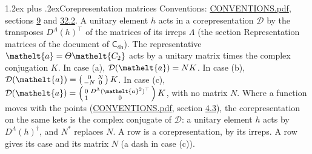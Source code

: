 \documentclass[10pt,a4paper]{article}
\makeatletter
\renewcommand\section{\@startsection{section}{1}{\z@}{-3ex plus -1ex minus -.2ex}%
  {1.2ex plus .2ex}{\normalfont\large\sffamily\bfseries\color{parttitle}}}
\numberwithin{equation}{section}
\newcommand{\eltfont}[1]{{\let\sigma\eltsigma\mathelt{#1}}}
\newcommand{\grp}[1]{\mathsf{#1}}
\newcommand{\elt}[1]{\eltfont{#1}}
\makeatother
\begin{document}
\section{Corepresentation matrices}\label{s:corep_matrices}
Conventions: \href{../../CONVENTIONS.pdf}{CONVENTIONS.pdf}, sections \href{../../../rotation/CONVENTIONS.pdf\#conv.9}{9} and \href{../../CONVENTIONS.pdf\#conv.32.2}{32.2}.
A unitary element $h$ acts in a corepresentation $\mathcal{D}$ by the transposes $D^{\Lambda}(h)^{\top}$ of the matrices of its irreps $\Lambda$ (the section Representation matrices of the document of \href{../../../rotation/data/pdf/C4h.pdf}{$\grp{C_{4h}}$}). The representative $\elt{a} = \varTheta\elt{C_{2}}$ acts by a unitary matrix times the complex conjugation $K$.
In case (a), $\mathcal{D}(\elt{a}) = NK$. In case (b), $\mathcal{D}(\elt{a}) = \left(\begin{smallmatrix} 0 & N \\ -N & 0 \end{smallmatrix}\right) K$. In case (c), $\mathcal{D}(\elt{a}) = \left(\begin{smallmatrix} 0 & D^{\Lambda}(\elt{a}^2)^{\top} \\ 1 & 0 \end{smallmatrix}\right) K$, with no matrix $N$.
Where a function moves with the points (\href{../../CONVENTIONS.pdf}{CONVENTIONS.pdf}, section \href{../../../rotation/CONVENTIONS.pdf\#conv.4.3}{4.3}), the corepresentation on the same kets is the complex conjugate of $\mathcal{D}$: a unitary element $h$ acts by $D^{\Lambda}(h)^{\dagger}$, and $N^{*}$ replaces $N$.
A row is a corepresentation, by its irreps. A row gives its case and its matrix $N$ (a dash in case (c)).
\end{document}
